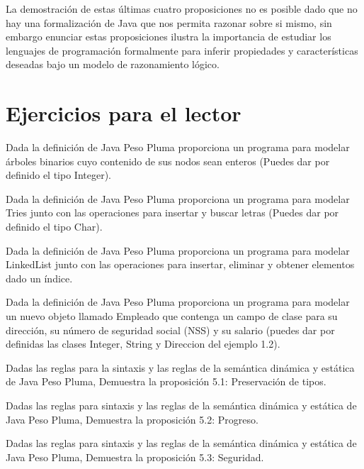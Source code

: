 La demostración de estas últimas cuatro proposiciones no es posible dado que no hay una formalización de \textsf{Java} que nos permita razonar sobre si mismo, sin embargo enunciar estas proposiciones ilustra la importancia de estudiar los lenguajes de programación formalmente para inferir propiedades y características deseadas bajo un modelo de razonamiento lógico.


\section{Ejercicios para el lector}

\begin{exercise}
    Dada la definición de \textsf{Java Peso Pluma} proporciona un programa para modelar árboles binarios cuyo contenido de sus nodos sean enteros (Puedes dar por definido el tipo \textsf{Integer}).
\end{exercise}




\begin{exercise}
    Dada la definición de \textsf{Java Peso Pluma} proporciona un programa para modelar Tries junto con las operaciones para insertar y buscar letras (Puedes dar por definido el tipo \textsf{Char}).
\end{exercise}



\begin{exercise}
    Dada la definición de \textsf{Java Peso Pluma} proporciona un programa para modelar LinkedList junto con las operaciones para insertar, eliminar y obtener elementos dado un índice.
\end{exercise}



\begin{exercise}
    Dada la definición de \textsf{Java Peso Pluma} proporciona un programa para modelar un nuevo objeto llamado \textsf{Empleado} que contenga un campo de clase para su dirección, su número de seguridad social (NSS) y su salario (puedes dar por definidas las clases \textsf{Integer, String y Direccion} del ejemplo 1.2).
\end{exercise}



\begin{exercise}
    Dadas las reglas para la sintaxis y las reglas de la semántica dinámica y estática de \textsf{Java Peso Pluma}, Demuestra la proposición 5.1: Preservación de tipos.
\end{exercise}



\begin{exercise}
   Dadas las reglas para sintaxis y las reglas de la semántica dinámica y estática de \textsf{Java Peso Pluma}, Demuestra la proposición 5.2: Progreso.
\end{exercise}



\begin{exercise}
   Dadas las reglas para sintaxis y las reglas de la semántica dinámica y estática de \textsf{Java Peso Pluma}, Demuestra la proposición 5.3: Seguridad.
\end{exercise}